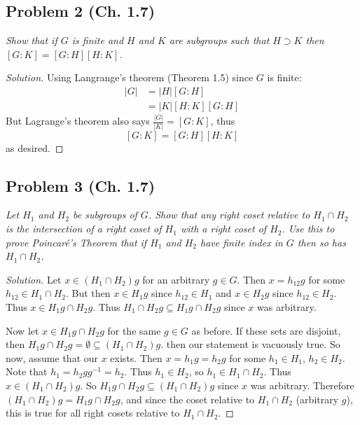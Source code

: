 \documentclass{article}
\begin{document}
\subsection*{Problem 2 (Ch. 1.7)}
{\it Show that if $G$ is finite and $H$ and $K$ are subgroups
such that $H \supset K$
then $[G:K] = [G:H] [H:K]$.}
\begin{proof}[Solution]\let\qed\relax
	Using Langrange's theorem (Theorem 1.5) since $G$ is finite:
	\begin{align*}
		|G|
		&= |H|[G:H]\\
		&= |K|[H:K][G:H]
	\end{align*}
	But Lagrange's theorem also says $\frac{|G|}{|K|} = [G:K]$,
	thus
	\[
		[G:K] = [G:H][H:K]
	\]
	as desired.
\end{proof}

\subsection*{Problem 3 (Ch. 1.7)}
{\it Let $H_1$ and $H_2$ be subgroups of $G$.
Show that any right coset relative to $H_1 \cap H_2$
is the intersection of a right coset of $H_1$ with a right coset of $H_2$.
Use this to prove \emph{Poincar\'{e}'s Theorem}
that if $H_1$ and $H_2$ have finite index in $G$ then so has $H_1 \cap H_2$.}
\begin{proof}[Solution]\let\qed\relax
	Let $x \in (H_1\cap H_2)g$ for an arbitrary $g \in G$.
	Then $x = h_{12}g$ for some $h_{12} \in H_1 \cap H_2$.
	But then $x \in H_1g$ since $h_{12} \in H_1$
	and $x \in H_2g$ since $h_{12} \in H_2$.
	Thus $x \in H_1g \cap H_2g$.
	Thus $H_1\cap H_2g \subseteq H_1g \cap H_2g$ since $x$ was arbitrary.

	Now let $x \in H_1g \cap H_2g$ for the same $g \in G$ as before.
	If these sets are disjoint, then $H_1g \cap H_2g = \emptyset \subseteq (H_1 \cap H_2)g$.
	then our statement is vacuously true.
	So now, assume that our $x$ exists.
	Then $x = h_1g = h_2g$ for some $h_1 \in H_1$, $h_2 \in H_2$.
	Note that $h_1 = h_2gg^{-1} = h_2$.
	Thus $h_1 \in H_2$, so $h_1 \in H_1 \cap H_2$.
	Thus $x \in (H_1 \cap H_2)g$.
	So $H_1g \cap H_2g \subseteq (H_1 \cap H_2)g$ since $x$ was arbitrary.
	Therefore $(H_1 \cap H_2)g = H_1g \cap H_2g$,
	and since the coset relative to $H_1 \cap H_2$ (arbitrary $g$),
	this is true for all right cosets relative to $H_1 \cap H_2$.
\end{proof}
\end{document}
